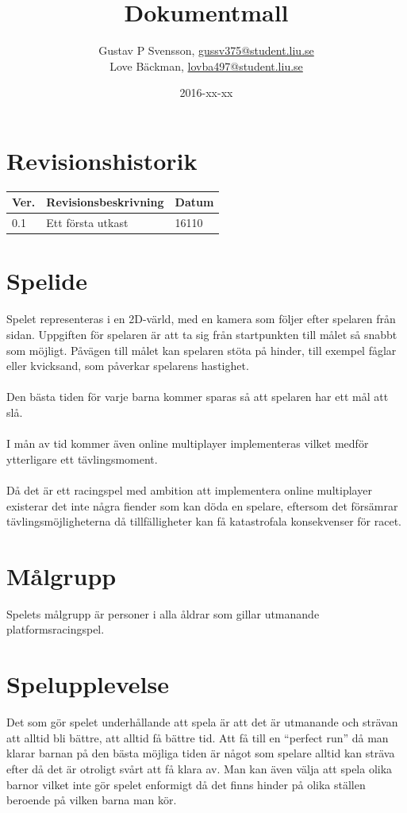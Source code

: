 \documentclass{TDP003mall}
\author{Gustav P Svensson, \url{gussv375@student.liu.se}\\
  Love Bäckman, \url{lovba497@student.liu.se}}
\title{Dokumentmall}
\date{2016-xx-xx}
\begin{document}
\projectpage

\tableofcontents
\newpage

\section{Revisionshistorik}
\begin{table}[!h]
\begin{tabularx}{\linewidth}{|l|X|l|}
\hline
Ver. & Revisionsbeskrivning & Datum \\\hline
0.1 & Ett första utkast & 16110 \\\hline
\end{tabularx}
\end{table}


\section{Spelide}
Spelet representeras i en 2D-värld, med en kamera som följer efter spelaren från sidan. Uppgiften för spelaren är att ta sig från startpunkten till målet så snabbt som möjligt. Påvägen till målet kan spelaren stöta på hinder, till exempel fåglar eller kvicksand, som påverkar spelarens hastighet.
\\\\
Den bästa tiden för varje barna kommer sparas så att spelaren har ett mål att slå.
\\\\
I mån av tid kommer även online multiplayer implementeras vilket medför ytterligare ett tävlingsmoment.
\\\\
Då det är ett racingspel med ambition att implementera online multiplayer existerar det inte några fiender som kan döda en spelare, eftersom det försämrar tävlingsmöjligheterna då tillfälligheter kan få katastrofala konsekvenser för racet.


\section{Målgrupp}
Spelets målgrupp är personer i alla åldrar som gillar utmanande platformsracingspel.

\section{Spelupplevelse}
Det som gör spelet underhållande att spela är att det är utmanande och strävan att alltid bli bättre, att alltid
få bättre tid. Att få till en ``perfect run'' då man klarar barnan på den bästa möjliga tiden är något som spelare alltid kan sträva efter då det är otroligt svårt att få klara av.\newline
Man kan även välja att spela olika barnor vilket inte gör spelet enformigt då det finns hinder på olika ställen beroende på vilken barna man kör.
\end{document}
